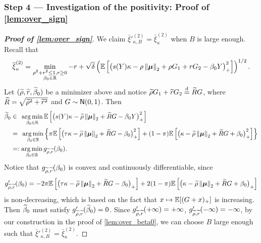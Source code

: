 \subsubsection{Step 4 --- Investigation of the positivity: Proof of \cref{lem:over_sign}}
\label{subsubsec:over_positive}
\begin{proof}[\textbf{Proof of \cref{lem:over_sign}}]
We claim $\bar\xi'^{(2)}_{\kappa, B} = \bar\xi_{\kappa}^{(2)}$ when $B$ is large enough. Recall that
\begin{equation*}
        \overline\xi_{\kappa}^{(2)} =  \min_{ \substack{ \rho^2 + r^2 \le 1, r \ge 0 \\  \beta_0 \in  \mathbb{R} } }
    -r + \sqrt{\delta} \left( \mathbb{E}\left[ \bigl(  s(Y) \kappa - \rho \left\|{\text{\boldmath $\mu$}}\right\|_2 + \rho G_1 + rG_2 - \beta_0 Y \bigr)_+^2 \right] \right)^{1/2}.
\end{equation*}
Let $(\widetilde\rho, \widetilde r, \widetilde\beta_{0})$ be a minimizer above and notice $\widetilde\rho G_1 + \widetilde r G_2 \overset{\mathrm{d}}{=} \widetilde R G$, where $\widetilde R = \sqrt{\widetilde\rho^2 + \widetilde r^2}$ and $G \sim {\sf N}(0, 1)$. Then
\begin{align*}
        \widetilde\beta_{0} & \in \phantom{:} \operatorname*{arg\,min}_{\beta_0 \in \mathbb{R}} \mathbb{E}\left[ \bigl(  s(Y) \kappa - \widetilde\rho \left\|{\text{\boldmath $\mu$}}\right\|_2 + \widetilde R G - \beta_0 Y \bigr)_+^2 \right] \\
        & = \phantom{:} \operatorname*{arg\,min}_{\beta_0 \in \mathbb{R}} \left\{ 
            \pi \mathbb{E}\left[ \bigl( \tau \kappa - \widetilde\rho \left\|{\text{\boldmath $\mu$}}\right\|_2 + \widetilde R G - \beta_0 \bigr)_+^2 \right]
            + (1 - \pi) \mathbb{E}\left[ \bigl( \kappa - \widetilde\rho \left\|{\text{\boldmath $\mu$}}\right\|_2 + \widetilde R G + \beta_0 \bigr)_+^2 \right] \right\} \\
        & =: \operatorname*{arg\,min}_{\beta_0 \in \mathbb{R}} g_{\widetilde\rho, \widetilde r}(\beta_0).
\end{align*}
Notice that $g_{\widetilde\rho, \widetilde r}(\beta_0)$ is convex and continuously differentiable, since
\begin{equation*}
    g'_{\widetilde\rho, \widetilde r}(\beta_0)
    = -2\pi \mathbb{E}\left[ \bigl( \tau \kappa - \widetilde\rho \left\|{\text{\boldmath $\mu$}}\right\|_2 + \widetilde R G - \beta_0 \bigr)_+ \right]
    + 2(1 - \pi) \mathbb{E}\left[ \bigl( \kappa - \widetilde\rho \left\|{\text{\boldmath $\mu$}}\right\|_2 + \widetilde R G + \beta_0 \bigr)_+ \right] 
\end{equation*}
is non-decreasing, which is based on the fact that $x \mapsto \mathbb{E}[(G + x)_+]$ is increasing. Then $\widetilde\beta_{0}$ must satisfy $g'_{\widetilde\rho, \widetilde r}(\widetilde\beta_{0}) = 0$. Since $g'_{\widetilde\rho, \widetilde r}(+\infty) = +\infty$, $g'_{\widetilde\rho, \widetilde r}(-\infty) = -\infty$, by our construction in the proof of \cref{lem:over_beta0}, we can choose $B$ large enough such that $\bar\xi'^{(2)}_{\kappa, B} = \bar\xi_{\kappa}^{(2)}$.



\end{proof}
